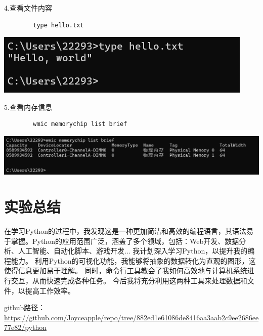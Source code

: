 \documentclass{article}
\begin{document}
	4.查看文件内容
	\begin{verbatim}
		type hello.txt
	\end{verbatim}
	
	\noindent
	\begin{minipage}{\linewidth}
		\centering
		\includegraphics[width=0.5\linewidth]{example14.png}
		\label{fig:example}
	\end{minipage}
	
	5.查看内存信息
	\begin{verbatim}
		wmic memorychip list brief
	\end{verbatim}
	
	\noindent
	\begin{minipage}{\linewidth}
		\centering
		\includegraphics[width=0.5\linewidth]{example15.png}
		\label{fig:example}
	\end{minipage}
	
	\section{实验总结}
	在学习Python的过程中，我发现这是一种更加简洁和高效的编程语言，其语法易于掌握。Python的应用范围广泛，涵盖了多个领域，包括：Web开发、数据分析、人工智能、自动化脚本、游戏开发...
	我计划深入学习Python，以提升我的编程能力。
	利用Python的可视化功能，我能够将抽象的数据转化为直观的图形，这使得信息更加易于理解。
	同时，命令行工具教会了我如何高效地与计算机系统进行交互，从而快速完成各种任务。
	今后我将充分利用这两种工具来处理数据和文件，以提高工作效率。

	github路径：
	\url{https://github.com/Joyceapple/repo/tree/882ed1e61086de8416aa3aab2c9ee2686ee77e82/python}
\end{document}
